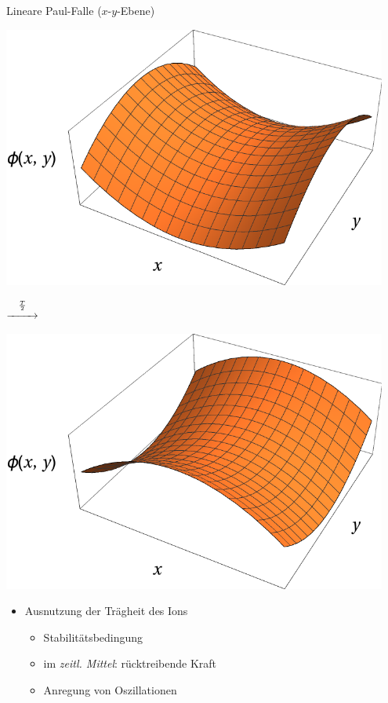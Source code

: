 \documentclass[12pt,xcolor=dvipsnames,professionalfonts]{beamer}
\begin{document}
\begin{frame}{Lineare Paul-Falle ($x$-$y$-Ebene)}
	\begin{minipage}[t]{0.45\textwidth}
		\centering
		\includegraphics[width=0.95\textwidth]{./figures/sattelpotential.pdf}
	\end{minipage}%
	\begin{minipage}[c]{0.1\textwidth}
		$\stackrel{\frac{T}{2}}{\xrightarrow{\hspace*{.8cm}}}$
	\end{minipage}%
	\begin{minipage}[t]{0.45\textwidth}
		\centering
		\includegraphics[width=0.95\textwidth]{./figures/sattelpotential2.pdf}
	\end{minipage}
	\vspace{0.3cm}
	\begin{itemize}
		\item Ausnutzung der Trägheit des Ions
		\begin{itemize}
			\item Stabilitätsbedingung
			\item im \textit{zeitl. Mittel}: rücktreibende Kraft
			\item Anregung von Oszillationen
		\end{itemize}
	\end{itemize}
\end{frame}
\end{document}
